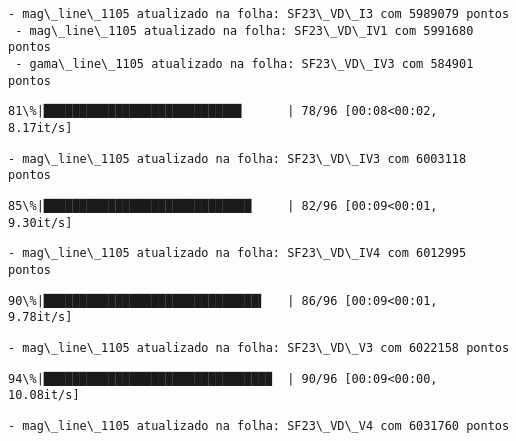 \documentclass[11pt]{article}
\begin{document}
    \begin{Verbatim}[commandchars=\\\{\}]
 - mag\_line\_1105 atualizado na folha: SF23\_VD\_I3 com 5989079 pontos
 - mag\_line\_1105 atualizado na folha: SF23\_VD\_IV1 com 5991680 pontos
 - gama\_line\_1105 atualizado na folha: SF23\_VD\_IV3 com 584901 pontos
    \end{Verbatim}

    \begin{Verbatim}[commandchars=\\\{\}]
 81\%|███████████████████████████▋      | 78/96 [00:08<00:02,  8.17it/s]
    \end{Verbatim}

    \begin{Verbatim}[commandchars=\\\{\}]
 - mag\_line\_1105 atualizado na folha: SF23\_VD\_IV3 com 6003118 pontos
    \end{Verbatim}

    \begin{Verbatim}[commandchars=\\\{\}]
 85\%|█████████████████████████████     | 82/96 [00:09<00:01,  9.30it/s]
    \end{Verbatim}

    \begin{Verbatim}[commandchars=\\\{\}]
 - mag\_line\_1105 atualizado na folha: SF23\_VD\_IV4 com 6012995 pontos
    \end{Verbatim}

    \begin{Verbatim}[commandchars=\\\{\}]
 90\%|██████████████████████████████▍   | 86/96 [00:09<00:01,  9.78it/s]
    \end{Verbatim}

    \begin{Verbatim}[commandchars=\\\{\}]
 - mag\_line\_1105 atualizado na folha: SF23\_VD\_V3 com 6022158 pontos
    \end{Verbatim}

    \begin{Verbatim}[commandchars=\\\{\}]
 94\%|███████████████████████████████▉  | 90/96 [00:09<00:00, 10.08it/s]
    \end{Verbatim}

    \begin{Verbatim}[commandchars=\\\{\}]
 - mag\_line\_1105 atualizado na folha: SF23\_VD\_V4 com 6031760 pontos
    \end{Verbatim}
\end{document}
